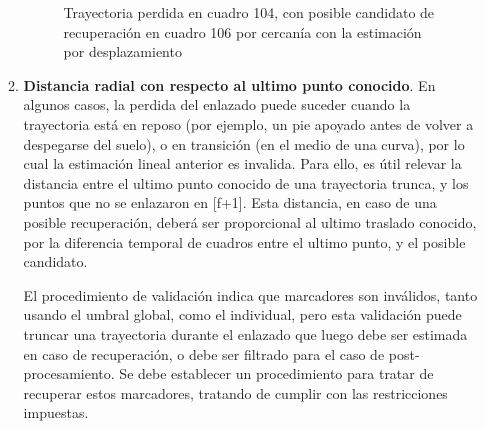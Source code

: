\begin{itemize}
\begin{enumerate}
\begin{figure}[H]
\caption{Trayectoria perdida en cuadro 104, con posible candidato de recuperación en cuadro 106 por cercanía con la estimación por desplazamiento}
\label{inventario_trayectoria_direccional}
\end{figure} 
  
  \item \textbf{Distancia radial con respecto al ultimo punto conocido}. En algunos casos, la perdida del enlazado puede suceder cuando la trayectoria está en reposo (por ejemplo, un pie apoyado antes de volver a despegarse del suelo), o en transición (en el medio de una curva), por lo cual la estimación lineal anterior es invalida. Para ello, es útil relevar la distancia entre el ultimo punto conocido de una trayectoria trunca, y los puntos que no se enlazaron en [f+1]. Esta distancia, en caso de una posible recuperación, deberá ser proporcional al ultimo traslado conocido, por la diferencia temporal de cuadros entre el ultimo punto, y el posible candidato.
 
El procedimiento de validación indica que marcadores son inválidos, tanto usando el umbral global, como el individual, pero esta validación puede truncar una trayectoria durante el enlazado que luego debe ser estimada en caso de recuperación, o debe ser filtrado para el caso de post-procesamiento. Se debe establecer un procedimiento para tratar de recuperar estos marcadores, tratando de cumplir con las restricciones impuestas.
 
  
\end{enumerate} 

\end{itemize}

